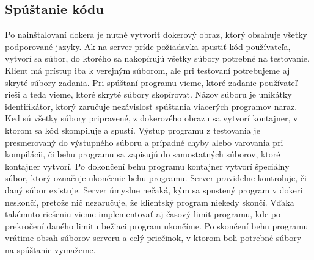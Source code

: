 \subsection{Spúštanie kódu}
Po nainštalovaní dokera je nutné vytvoriť dokerový obraz, ktorý obsahuje všetky podporované
jazyky. Ak na server príde požiadavka spustiť kód používateľa, vytvorí sa súbor, do ktorého sa
nakopírujú všetky súbory potrebné na testovanie. Klient má prístup iba k verejným súborom, ale
pri testovaní potrebujeme aj skryté súbory zadania. Pri spúštaní programu vieme, ktoré zadanie
používateľ rieši a teda vieme, ktoré skryté súbory skopírovať. Názov súboru je unikátky
identifikátor, ktorý zaručuje nezávislosť spúštania viacerých programov naraz. Keď sú všetky súbory
pripravené, z dokerového obrazu sa vytvorí kontajner, v ktorom sa kód skompiluje a spustí. Výstup
programu z testovania je presmerovaný do výstupného súboru a prípadné chyby alebo varovania pri
kompilácii, či behu programu sa zapisujú do samostatných súborov, ktoré kontajner vytvorí. Po
dokončení behu programu kontajner vytvorí špeciálny súbor, ktorý označuje ukončenie behu programu.
Server pravidelne kontroluje, či daný súbor existuje. Server úmyslne nečaká, kým sa spustený program
v dokeri neskončí, pretože nič nezaručuje, že klientský program niekedy skončí. Vďaka takémuto
riešeniu vieme implementovať aj časový limit programu, kde po prekročení daného limitu bežiaci
program ukončíme. Po skončení behu programu vrátime obsah súborov serveru a celý priečinok, v
ktorom boli potrebné súbory na spúštanie vymažeme.

